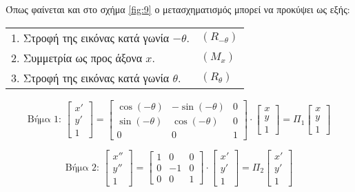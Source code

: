 Όπως φαίνεται και στο σχήμα \ref{fig:9} ο μετασχηματισμός μπορεί να προκύψει ως εξής:
 
\begin{tabular}{m{}m{}}
	1. Στροφή της εικόνας κατά γωνία \( -\theta \). & \( (R_{-\theta}) \) \\
	2. Συμμετρία ως προς άξονα $x$.& \( (M_x) \)\\
	3.  Στροφή της εικόνας κατά γωνία \( \theta \).& \( (R_{\theta}) \)
\end{tabular}


\[
\text{Βήμα 1: } 
\begin{bmatrix}
x' \\ y' \\ 1
\end{bmatrix}
=
\begin{bmatrix}
\cos(-\theta) & -\sin(-\theta) & 0 \\
\sin(-\theta) & \cos(-\theta) & 0 \\
0 & 0 & 1
\end{bmatrix}
\cdot
\begin{bmatrix}
x \\ y \\ 1
\end{bmatrix}
= \Pi_1
\begin{bmatrix}
x \\ y \\ 1
\end{bmatrix}
\]

\[
\text{Βήμα 2: } 
\begin{bmatrix}
x'' \\ y'' \\ 1
\end{bmatrix}
=
\begin{bmatrix}
1 & 0 & 0 \\
0 & -1 & 0 \\
0 & 0 & 1
\end{bmatrix}
\cdot
\begin{bmatrix}
x' \\ y' \\ 1
\end{bmatrix}
= \Pi_2
\begin{bmatrix}
x' \\ y' \\ 1
\end{bmatrix}
\]

